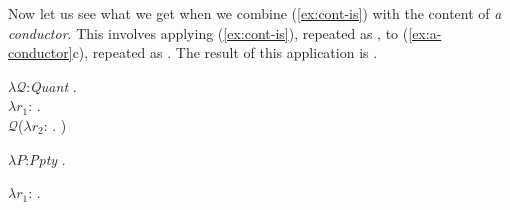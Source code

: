 Now let us see what we get when we combine  (\ref{ex:cont-is}) with the content of
\textit{a conductor}.  This involves applying (\ref{ex:cont-is}),
repeated as , to (\ref{ex:a-conductor}c), repeated as
.  The result of this application is .
\begin{ex} 
\begin{subex} 
 
\item $\lambda\mathcal{Q}$:\textit{Quant} . \\
\hspace*{1em} $\lambda r_1$:
. \\
\hspace*{2em} $\mathcal{Q}$($\lambda
r_2$:
. ) 
 
\item $\lambda P$:\textit{Ppty}
. 

\item $\lambda
r_1$:
. \\
\hspace*{1em} 
 
\end{subex} 
   
\end{ex} 


